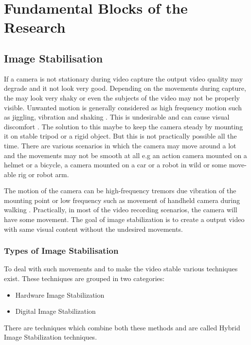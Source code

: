 \chapter{Fundamental Blocks of the Research} \label{chapter_two}


\section{Image Stabilisation}
If a camera is not stationary during video capture the output video quality may degrade and it not look very good. Depending on the movements during capture, the may look very shaky or even the subjects of the video may not be properly visible. Unwanted motion is generally considered as high frequency motion such as jiggling, vibration and shaking \citep{ryu2012robust}. This is undesirable and can cause visual discomfort \citep{jia2012probabilistic}. The solution to this maybe to keep the camera steady by mounting it on stable tripod or a rigid object. But this is not practically possible all the time. There are various scenarios in which the camera may move around a lot and the movements may not be smooth at all e.g an action camera mounted on a helmet or a bicycle, a camera mounted on a car or a robot in wild or some move-able rig or robot arm. 

The motion of the camera can be high-frequency tremors due vibration of the mounting point or low frequency such as movement of handheld camera during walking \citep{dis_review}. Practically, in most of the video recording scenarios, the camera will have some movement. The goal of image stabilization is to create a output video with same visual content without the undesired movements. 

\subsection{Types of Image Stabilisation}
To deal with such movements and to make the video stable various techniques exist. These techniques are grouped in two categories:

\begin{itemize}
\item Hardware Image Stabilization
\item Digital Image Stabilization  
\end{itemize}
There are techniques which combine both these methods and are called Hybrid Image Stabilization techniques.

